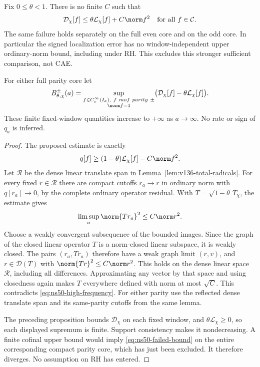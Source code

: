 \begin{proposition}
\label{prop:ns50-critical-coefficient}
Fix $0\le\theta<1$. There is no finite $C$ such that
\begin{equation}\label{eq:ns50-failed-bound}
 \mathcal D_\chi[f]\le
            \theta\mathcal L_\chi[f]+C\norm f^2
 \quad\hbox{for all }f\in\mathcal C.
\end{equation}
The same failure holds separately on the full even core and on the
odd core. In particular the signed localization error has no
window-independent upper ordinary-norm bound, including under RH.
This excludes this stronger sufficient comparison, not CAE.

For either full parity core let
\[
 B_{\theta,\chi}^{\pm}(a)=
 \sup_{\substack{f\in C_c^\infty(I_a),\ f\ {
m of\ parity}\ \pm\\
                 \norm f=1}}
   \bigl(\mathcal D_\chi[f]-\theta\mathcal L_\chi[f]\bigr).
\]
These finite fixed-window quantities increase to $+\infty$ as
$a\to\infty$. No rate or sign of $q_a$ is inferred.
\end{proposition}
\begin{proof}
The proposed estimate is exactly
\[
 q[f]\ge(1-\theta)\mathcal L_\chi[f]-C\norm f^2.
\]
Let $\mathcal R$ be the dense linear translate span in
Lemma~\ref{lem:v136-total-radicals}. For every fixed $r\in\mathcal R$
there are compact cutoffs $r_a\to r$ in ordinary norm with
$q[r_a]\to0$, by the complete ordinary operator residual.
With $T=\sqrt{1-\theta}\,T_\chi$, the estimate gives
\[
 \limsup_a\norm{Tr_a}^2\le C\norm r^2.
\]
Choose a weakly convergent subsequence of the bounded images. Since
the graph of the closed linear operator $T$ is a norm-closed linear
subspace, it is weakly closed. The pairs $(r_a,Tr_a)$ therefore have
a weak graph limit $(r,v)$, and
$r\in\mathcal D(T)$ with $\norm{Tr}^2\le C\norm r^2$.
This holds on the dense linear space $\mathcal R$, including all
differences. Approximating any vector by that space and using
closedness again makes $T$ everywhere defined with norm at most
$\sqrt C$. This contradicts \eqref{eq:ns50-high-frequency}.
For either parity use the reflected dense translate span and its
same-parity cutoffs from the same lemma.

The preceding proposition bounds $\mathcal D_\chi$ on each fixed
window, and $\theta\mathcal L_\chi\ge0$, so each displayed supremum
is finite. Support consistency makes it nondecreasing. A finite
cofinal upper bound would imply \eqref{eq:ns50-failed-bound} on
the entire corresponding compact parity core, which has just been
excluded. It therefore diverges. No assumption on RH has entered.
\end{proof}

